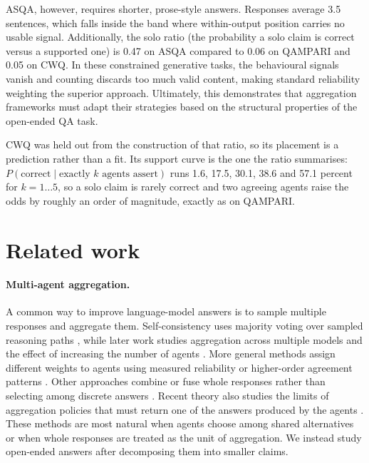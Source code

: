 \documentclass[11pt]{article}
\begin{document}
ASQA, however, requires shorter, prose-style answers. Responses average 3.5 sentences, which falls inside the band where within-output position carries no usable signal. Additionally, the solo ratio (the probability a solo claim is correct versus a supported one) is 0.47 on ASQA compared to 0.06 on QAMPARI and 0.05 on CWQ. In these constrained generative tasks, the behavioural signals vanish and counting discards too much valid content, making standard reliability weighting the superior approach. Ultimately, this demonstrates that aggregation frameworks must adapt their strategies based on the structural properties of the open-ended QA task.

CWQ was held out from the construction of that ratio, so its placement is a prediction rather than a fit. Its support curve is the one the ratio summarises: $P(\mathrm{correct} \mid \text{exactly } k \text{ agents assert})$ runs 1.6, 17.5, 30.1, 38.6 and 57.1 percent for $k = 1 \dots 5$, so a solo claim is rarely correct and two agreeing agents raise the odds by roughly an order of magnitude, exactly as on QAMPARI.

\section{Related work}
\label{sec:related}

\paragraph{Multi-agent aggregation.}
A common way to improve language-model answers is to sample multiple responses and aggregate them. Self-consistency uses majority voting over sampled reasoning paths \citep{wang2022self}, while later work studies aggregation across multiple models and the effect of increasing the number of agents \citep{li2024agents}. More general methods assign different weights to agents using measured reliability or higher-order agreement patterns \citep{ai2025majority}. Other approaches combine or fuse whole responses rather than selecting among discrete answers \citep{jiang2023llm,chen2023universal}. Recent theory also studies the limits of aggregation policies that must return one of the answers produced by the agents \citep{ananthakrishnan2026power}. These methods are most natural when agents choose among shared alternatives or when whole responses are treated as the unit of aggregation. We instead study open-ended answers after decomposing them into smaller claims.
\end{document}
